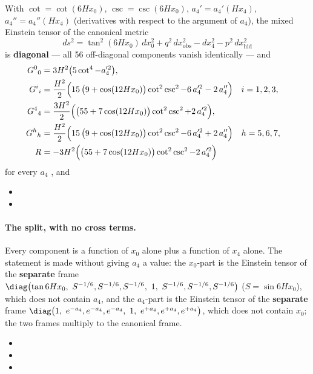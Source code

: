 With $\cot=\cot(6Hx_0)$, $\csc=\csc(6Hx_0)$, $a_4'=a_4'(Hx_4)$, $a_4''=a_4''(Hx_4)$ (derivatives with
respect to the argument of $a_4$), the mixed Einstein tensor of the canonical metric
\[
  ds^2=\tan^2(6Hx_0)\,dx_0^2+q^2\,dx_{\mathrm{obs}}^2-dx_4^2-p^2\,dx_{\mathrm{hid}}^2
\]
is \textbf{diagonal} --- all 56 off-diagonal components vanish identically --- and
\begin{align*}
  G^0{}_0&=3H^2\bigl(5\cot^4-a_4'^2\bigr),\\
  G^i{}_i&=\frac{H^2}{2}\Bigl(15\,\bigl(9+\cos(12Hx_0)\bigr)\cot^2\csc^2-6\,a_4'^2-2\,a_4''\Bigr) &&i=1,2,3,\\
  G^4{}_4&=\frac{3H^2}{2}\Bigl(\bigl(55+7\cos(12Hx_0)\bigr)\cot^2\csc^2+2\,a_4'^2\Bigr),\\
  G^h{}_h&=\frac{H^2}{2}\Bigl(15\,\bigl(9+\cos(12Hx_0)\bigr)\cot^2\csc^2-6\,a_4'^2+2\,a_4''\Bigr) &&h=5,6,7,\\
  R&=-3H^2\Bigl(\bigl(55+7\cos(12Hx_0)\bigr)\cot^2\csc^2-2\,a_4'^2\Bigr)
\end{align*}
for every $a_4$ , and 
\begin{itemize}
  \item {}
  \item {}
\end{itemize}

\paragraph{The split, with no cross terms.} Every component is a function of $x_0$ alone plus a function
of $x_4$ alone. The statement is made without giving $a_4$ a value: the $x_0$-part is the Einstein
tensor of the \textbf{separate} frame $\diag\bigl(\tan 6Hx_0,\ S^{-1/6},S^{-1/6},S^{-1/6},\ 1,\ S^{-1/6},S^{-1/6},S^{-1/6}\bigr)$
($S=\sin 6Hx_0$), which does not contain $a_4$, and the $a_4$-part is the Einstein tensor of the
\textbf{separate} frame $\diag\bigl(1,\ e^{-a_4},e^{-a_4},e^{-a_4},\ 1,\ e^{+a_4},e^{+a_4},e^{+a_4}\bigr)$, which does not contain
$x_0$; the two frames multiply to the canonical frame. 
\begin{itemize}
  \item {}
  \item {}
  \item {}
\end{itemize}

